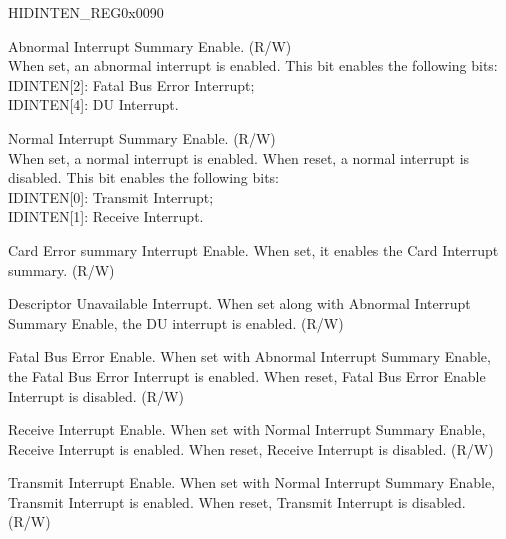 \begin{register}{H}{IDINTEN\_REG}{0x0090}\label{regdesc:IDINTENREG}
%
%
%
%
%
%
%
%
%
%
\regnewline%
\begin{regdesc}\begin{reglist}
\item [IDINTEN\_AI]Abnormal Interrupt Summary Enable. (R/W)
\\When set, an abnormal interrupt is enabled. This bit enables the following bits:\\
IDINTEN[2]: Fatal Bus Error Interrupt;\\
IDINTEN[4]: DU Interrupt. \\
\item [IDINTEN\_NI]Normal Interrupt Summary Enable. (R/W)\\
When set, a normal interrupt is enabled. When reset, a normal interrupt is disabled. This bit enables the following bits:\\
IDINTEN[0]: Transmit Interrupt;\\
IDINTEN[1]: Receive Interrupt.
\item [IDINTEN\_CES]Card Error summary Interrupt Enable. When set, it enables the Card Interrupt summary. (R/W)
\item [IDINTEN\_DU]Descriptor Unavailable Interrupt. When set along with Abnormal Interrupt Summary Enable, the DU interrupt is enabled. (R/W)
\item [IDINTEN\_FBE]Fatal Bus Error Enable. When set with Abnormal Interrupt Summary Enable, the Fatal Bus Error Interrupt is enabled. When reset, Fatal Bus Error Enable Interrupt is disabled. (R/W)
\item [IDINTEN\_RI]Receive Interrupt Enable. When set with Normal Interrupt Summary Enable, Receive Interrupt is enabled. When reset, Receive Interrupt is disabled. (R/W)
\item [IDINTEN\_TI]Transmit Interrupt Enable. When set with Normal Interrupt Summary Enable, Transmit Interrupt is enabled. When reset, Transmit Interrupt is disabled. (R/W)
\end{reglist}\end{regdesc}
\end{register}


